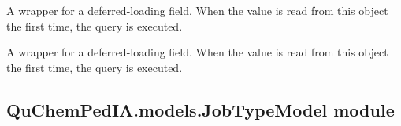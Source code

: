 \documentclass[letterpaper,10pt,english]{sphinxmanual}
\begin{document}
\begin{fulllineitems}
\begin{fulllineitems}
\end{fulllineitems}


\begin{fulllineitems}
\label{\detokenize{QuChemPedIA.models:QuChemPedIA.models.ImportRuleModel.ImportRule.id_version_id}}
A wrapper for a deferred-loading field. When the value is read from this
object the first time, the query is executed.

\end{fulllineitems}


\begin{fulllineitems}
\label{\detokenize{QuChemPedIA.models:QuChemPedIA.models.ImportRuleModel.ImportRule.objects}}
\end{fulllineitems}


\begin{fulllineitems}
\label{\detokenize{QuChemPedIA.models:QuChemPedIA.models.ImportRuleModel.ImportRule.rule}}
A wrapper for a deferred-loading field. When the value is read from this
object the first time, the query is executed.

\end{fulllineitems}


\end{fulllineitems}



\subsection{QuChemPedIA.models.JobTypeModel module}
\label{\detokenize{QuChemPedIA.models:module-QuChemPedIA.models.JobTypeModel}}\label{\detokenize{QuChemPedIA.models:quchempedia-models-jobtypemodel-module}}
\end{document}
